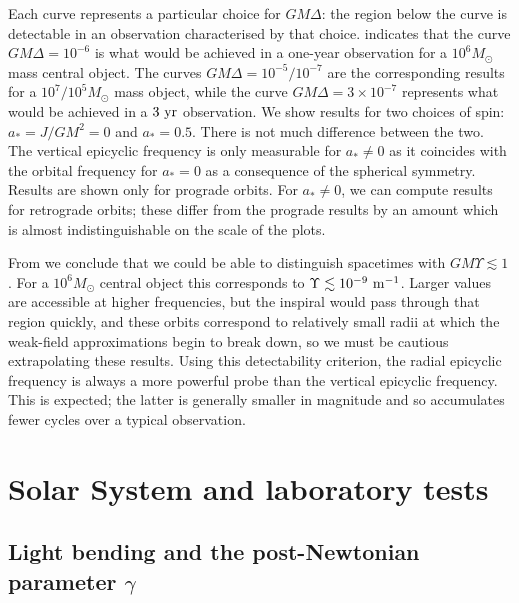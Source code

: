 Each curve represents a particular choice for $GM\Delta$: the region below the curve is detectable in an observation characterised by that choice.  indicates that the curve $GM\Delta = 10^{-6}$ is what would be achieved in a one-year observation for a $10^6 M_\odot$ mass central object. The curves $GM\Delta = 10^{-5}/10^{-7}$ are the corresponding results for a $10^7/10^5M_\odot$ mass object, while the curve $GM\Delta = 3 \times 10^{-7}$ represents what would be achieved in a $3~\mathrm{yr}$ observation. We show results for two choices of spin: $a_\ast = J/GM^2 = 0$ and $a_\ast = 0.5$. There is not much difference between the two. The vertical epicyclic frequency is only measurable for $a_\ast \neq 0$ as it coincides with the orbital frequency for $a_\ast = 0$ as a consequence of the spherical symmetry. Results are shown only for prograde orbits. For $a_\ast \neq 0$, we can compute results for retrograde orbits; these differ from the prograde results by an amount which is almost indistinguishable on the scale of the plots.

From  we conclude that we could be able to distinguish spacetimes with $GM\Upsilon \lesssim 1 $. For a $10^6 M_\odot$ central object this corresponds to $\Upsilon \lesssim 10^{-9}~\mathrm{m^{-1}}$. Larger values are accessible at higher frequencies, but the inspiral would pass through that region quickly, and these orbits correspond to relatively small radii at which the weak-field approximations begin to break down, so we must be cautious extrapolating these results. Using this detectability criterion, the radial epicyclic frequency is always a more powerful probe than the vertical epicyclic frequency. This is expected; the latter is generally smaller in magnitude and so accumulates fewer cycles over a typical observation.

\section{Solar System and laboratory tests}\label{sec:Tests}

\subsection{Light bending and the post-Newtonian parameter $\gamma$}

